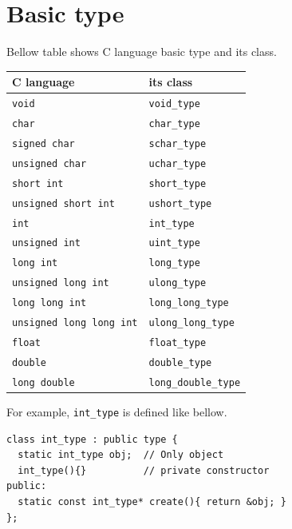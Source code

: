 \section{Basic type}

Bellow table shows C language basic type and its class.

\begin{latexonly}
\vspace{0.5cm}
\end{latexonly}

\begin{tabular}{|l|l|} \hline
C language & its class \\ \hline
{\tt{void}} & {\tt{void\_type}} \\ \hline
{\tt{char}} & {\tt{char\_type}} \\  \hline
{\tt{signed char}} & {\tt{schar\_type}} \\  \hline
{\tt{unsigned char}} & {\tt{uchar\_type}} \\  \hline
{\tt{short int}} & {\tt{short\_type}} \\  \hline
{\tt{unsigned short int}} & {\tt{ushort\_type}} \\  \hline
{\tt{int}} & {\tt{int\_type}} \\ \hline
{\tt{unsigned int}} & {\tt{uint\_type}} \\  \hline
{\tt{long int}} & {\tt{long\_type}} \\ \hline
{\tt{unsigned long int}} & {\tt{ulong\_type}} \\ \hline
{\tt{long long int}} & {\tt{long\_long\_type}} \\ \hline
{\tt{unsigned long long int}} & {\tt{ulong\_long\_type}} \\ \hline
{\tt{float}} & {\tt{float\_type}} \\ \hline
{\tt{double}} & {\tt{double\_type}} \\ \hline
{\tt{long double}} & {\tt{long\_double\_type}} \\ \hline
\end{tabular}

\begin{latexonly}
\vspace{0.5cm}
\end{latexonly}

For example, {\tt{int\_type}} is defined like bellow.
\begin{verbatim}
class int_type : public type {
  static int_type obj;  // Only object
  int_type(){}          // private constructor
public:
  static const int_type* create(){ return &obj; }
};
\end{verbatim}

